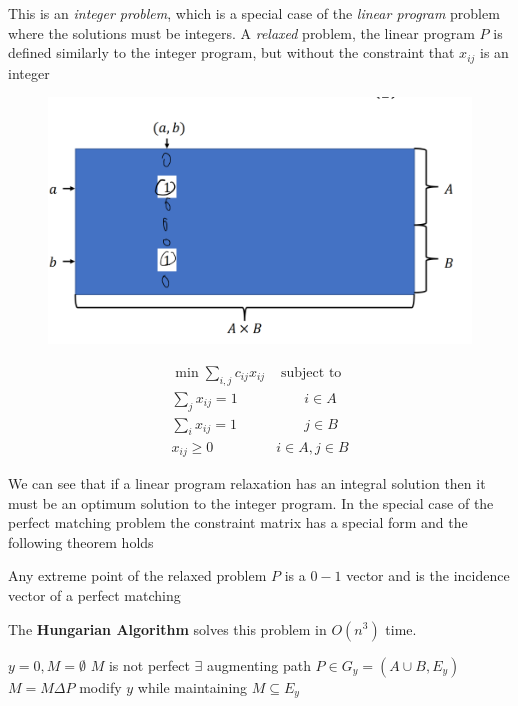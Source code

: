 \documentclass[../notes.tex]{subfiles}
\begin{document}
This is an \textit{integer problem}, which is a special case of the \textit{linear program} problem where the solutions must be integers.
A \textit{relaxed} problem, the linear program $ P $ is defined similarly to the integer program, but without the constraint that $ x_{ij} $ is an integer
\begin{figure}[H]
    \centering
    \includegraphics[width=0.8\linewidth]{img/image_2023-04-06-03-54-44.png}
\end{figure}
\begin{equation}
    \begin{split}
        \min \sum_{i, j} c_{ij} x_{ij} & \text{ subject to}  \\
         \sum_j x_{ij} = 1 &\qquad i \in A  \\
         \sum_i x_{ij} = 1 &\qquad j \in B  \\
         x_{ij} \ge  0 & i \in A, j \in B
    \end{split}
\end{equation}

We can see that if a linear program relaxation has an integral solution then it must be an optimum solution to the integer program.
In the special case of the perfect matching problem the constraint matrix has a special form and the following theorem holds


\begin{theorem}
    Any extreme point of the relaxed problem $ P $ is a $ 0-1 $ vector and is the incidence vector of a perfect matching
\end{theorem}

The \textbf{Hungarian Algorithm} solves this problem in $ O(n^3) $ time.


\begin{codebox}
\li $  y = 0, M = \emptyset$
\li \While $ M $ is not perfect \Do 
\li     \If $ \exists $ augmenting path $ P  \in  G_y = (A \cup B, E_y) $ \Then 
\li         $ M = M \Delta P $
\li     \Else
\li         modify $ y $ while maintaining $ M \subseteq E_y $ \End \End
\end{codebox}
\end{document}
